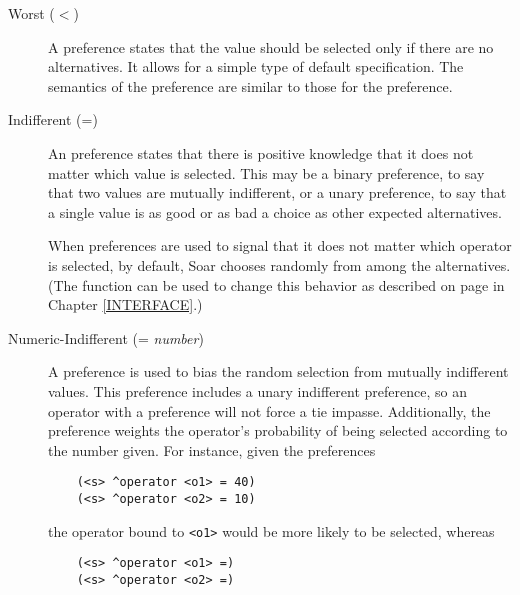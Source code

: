 \begin{description}
\item [Worst ($<$)] A  preference states that the value should be 
selected
        only if there are no alternatives.  It allows for a simple type of
        default specification. The semantics of the  preference
        are similar to those for the  preference.\vspace{-8pt}

\item [Indifferent (=)] An  preference states that there is
        positive knowledge that it does not matter which value is selected.
        This may be a binary preference, to say that two values are mutually
        indifferent, or a unary preference, to say that a single value is as
        good or as bad a choice as other expected alternatives.
        
	When  preferences are used to signal that it does
	not matter which operator is selected, by default, Soar
	chooses randomly from among the alternatives. (The
	 function can be used to change this
	behavior as described on
	page \pageref{indifferent-selection} in Chapter
	\ref{INTERFACE}.)\vspace{-8pt}

\item [Numeric-Indifferent (= \emph{number})] A  preference
	is used to bias the random selection from mutually indifferent values. This
	preference includes a unary indifferent preference, so an operator with a
	 preference will not force a tie impasse. Additionally,
	the preference weights the operator's probability of being selected according to
	the number given. For instance, given the preferences
	
	\begin{verbatim}
	(<s> ^operator <o1> = 40)
	(<s> ^operator <o2> = 10)
	\end{verbatim}
	
	the operator bound to \verb!<o1>! would be more likely to be selected, whereas 
	
	\begin{verbatim}
	(<s> ^operator <o1> =)
	(<s> ^operator <o2> =)
	\end{verbatim}
	

\end{description}
